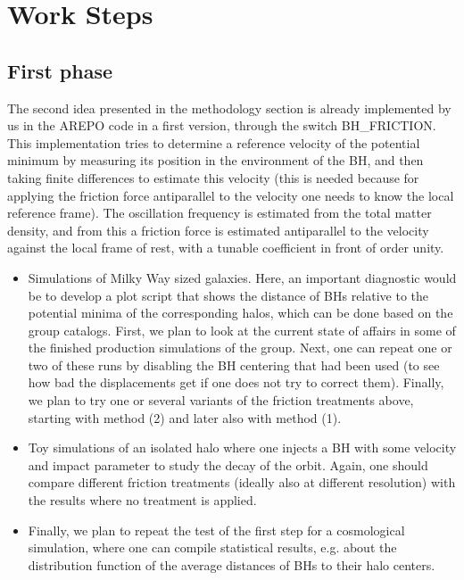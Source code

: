 \documentclass[a4,useAMS,usenatbib,usegraphicx,12pt]{article}
\begin{document}
\section{Work Steps}

\subsection*{First phase}

The second idea presented in the methodology section is already implemented by us
in the AREPO \citep{Springel2010} code in a first version, through the switch 
BH\_FRICTION. This implementation tries to determine a reference velocity of 
the potential minimum by measuring its position in the environment of the BH, 
and then taking finite differences to estimate this velocity (this is needed 
because for applying the friction force antiparallel to the velocity one needs 
to know the local reference frame). The oscillation frequency is estimated from 
the total matter density, and from this a friction force is estimated 
antiparallel to the velocity against the local frame of rest, with a tunable 
coefficient in front of order unity.

\begin{itemize}

\item Simulations of Milky Way sized galaxies. Here, an important diagnostic 
would be to develop a plot script that shows the distance of BHs relative to 
the potential minima of the corresponding halos, which can be done based on the 
group catalogs. First, we plan to look at the current state of affairs in some of 
the finished production simulations of the group. Next, one can repeat one 
or two of these runs by disabling the BH centering that had been used (to see 
how bad the displacements get if one does not try to correct them). Finally, 
we plan to try one or several variants of the friction treatments above,
starting with method (2) and later also with method (1).

\item Toy simulations of an isolated halo where one injects a BH with some 
velocity and impact parameter to study the decay of the orbit. Again, one should
compare different friction treatments (ideally also at different resolution) 
with the results where no treatment is applied.

\item Finally, we plan to repeat the test of the first step for a cosmological 
simulation, where one can compile statistical results, e.g. about the 
distribution function of the average distances of BHs to their halo centers.

\end{itemize}
\end{document}
